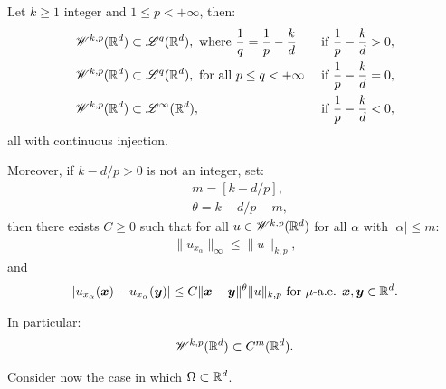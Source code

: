 \begin{corollary} \label{corollary:embedding}
    Let $k \geq 1$ integer and $1 \leq p < +\infty$, then:
    \begin{align}
        & \mathscr{W}^{k, p}(\mathbb{R}^{d}) \subset \mathscr{L}^{q}(\mathbb{R}^{d}), \text{ where } \frac{1}{q} = \frac{1}{p} - \frac{k}{d} & \text{ if } \frac{1}{p} - \frac{k}{d} > 0, \\
        & \mathscr{W}^{k, p}(\mathbb{R}^{d}) \subset \mathscr{L}^{q}(\mathbb{R}^{d}), \text{ for all } p \leq q < +\infty & \text{ if } \frac{1}{p} - \frac{k}{d} = 0, \\
        & \mathscr{W}^{k, p}(\mathbb{R}^{d}) \subset \mathscr{L}^{\infty}(\mathbb{R}^{d}), & \text{ if } \frac{1}{p} - \frac{k}{d} < 0,
    \end{align}
    all with continuous injection.

    Moreover, if $k - d/p > 0$ is not an integer, set:
    \begin{align}
        & m = \left[ k - d/p \right], \\
        & \theta = k - d/p - m,
    \end{align}
    then there exists $C \geq 0$ such that for all $u \in \mathscr{W}^{k, p}(\mathbb{R}^{d})$ for all $\alpha$ with $\lvert \alpha \rvert \leq m$:
    \begin{gather}
        \lVert u_{x_{\alpha}} \rVert_{\infty} \leq \lVert u \rVert_{k, p},
    \end{gather}
    and
    \begin{gather}
        \lvert u_{x_{\alpha}}(\bm{x}) - u_{x_{\alpha}}(\bm{y}) \rvert \leq C \lVert \bm{x} - \bm{y} \rVert^{\theta} \lVert u \rVert_{k, p} \text{ for } \mu \text{-a.e. } \bm{x}, \bm{y} \in \mathbb{R}^{d}.
    \end{gather}

    In particular:
    \begin{gather}
        \mathscr{W}^{k, p}(\mathbb{R}^{d}) \subset C^m(\mathbb{R}^{d}).
    \end{gather}
\end{corollary}

Consider now the case in which $\Omega \subset \mathbb{R}^{d}$.

